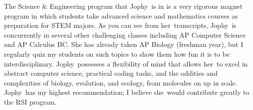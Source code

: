 \documentclass[10pt]{letter}
\newcommand\firstname{Jophy}
\newcommand\subject{she}
\newcommand\object{her}
\newcommand\possessive{her}
\begin{document}
\begin{letter}{%
}
The Science \& Engineering program that \firstname\ is in is a very rigorous magnet program in which students take advanced science and mathematics courses as preparation for STEM majors. As you can see from \possessive\ transcripts, \firstname\ is concurrently in several other challenging classes including AP Computer Science and AP Calculus BC. She has already taken AP Biology (freshman year), but I regularly quiz my students on such topics to show them how fun it is to be interdisciplinary. \firstname\ possesses a flexibility of mind that allows \object\ to excel in abstract computer science, practical coding tasks, and the oddities and complexities of biology, evolution, and ecology, from molecules on up in scale. \firstname\ has my highest recommendation; I believe \subject\ would contribute greatly to the RSI program. 

\noclosing

\end{letter}
\end{document}
